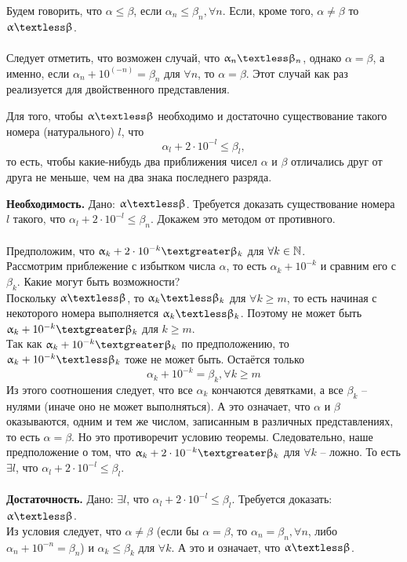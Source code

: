 Будем говорить, что $\alpha \leqslant \beta$, если $\alpha_n \leqslant \beta_n, \forall n$. Если, кроме того, $\alpha \neq \beta$ то $\alpha \textless \beta$.\\\\
Следует отметить, что возможен случай, что $\alpha_n \textless \beta_n$, однако $\alpha = \beta$, а именно, если  $\alpha_n + {10}^{(-n)} = \beta_n$ для $\forall n$, то $\alpha = \beta$. Этот случай как раз реализуется для двойственного представления.\\
\begin{theorem}
	Для того, чтобы $\alpha \textless \beta$ необходимо и достаточно существование такого номера (натурального) $l$, что
	\[\alpha_l + 2 \cdot 10^{-l} \leqslant \beta_l,\]
	то есть, чтобы какие-нибудь два приближения чисел $\alpha$ и $\beta$ отличались друг от друга не меньше, чем на два знака последнего разряда. 
\end{theorem}
\begin{Proof}
	\textbf{Необходимость.} Дано: $\alpha \textless \beta$.
	Требуется доказать существование номера $l$ такого, что $\alpha_l + 2 \cdot 10^{-l} \leqslant \beta_n$. Докажем это методом от противного.\\\\
	Предположим, что $\alpha_k + 2 \cdot 10^{-k} \textgreater \beta_k$ для $\forall k \in \mathbb{N}$.\\
	Рассмотрим приблежение с избытком числа $\alpha$, то есть $\alpha_k + 10^{-k}$ и сравним его с $\beta_k$. Какие могут быть возможности?\\
	Поскольку $\alpha \textless \beta$, то $\alpha_k \textless \beta_k$ для $\forall k \geqslant m$, то есть начиная с некоторого номера выполняется $\alpha_k \textless \beta_k$. Поэтому не может быть $\alpha_k + 10^{-k}\textgreater \beta_k$ для $k \geqslant m$.\\
	Так как $\alpha_k + 10^{-k}\textgreater \beta_k$ по предположению, то $\alpha_k + 10^{-k} \textless \beta_k$ тоже не может быть. Остаётся только
	\[\alpha_k + 10^{-k} = \beta_k, \forall k \geqslant m\]
	Из этого соотношения следует, что все $\alpha_k$ кончаются девятками, а все $\beta_k$ -- нулями (иначе оно не может выполняться). А это означает, что $\alpha$ и $\beta$ оказываются, одним и тем же числом, записанным в различных представлениях, то есть $\alpha = \beta$. Но это противоречит условию теоремы. Следовательно, наше предположение о том, что $\alpha_k + 2 \cdot 10^{-k} \textgreater \beta_k$ для $\forall k$ -- ложно. То есть $\exists l$, что $\alpha_l + 2 \cdot 10^{-l} \leqslant \beta_l$.\\\\
	\textbf{Достаточность.} Дано:  $\exists l$, что $\alpha_l + 2 \cdot 10^{-l} \leqslant \beta_l$.
	Требуется доказать: $\alpha \textless \beta$.\\
	Из условия следует, что $\alpha \neq \beta$ (если бы $\alpha = \beta$, то $\alpha_n = \beta_n, \forall n$, либо $\alpha_n + 10^{-n} = \beta_n$) и $\alpha_k \leqslant \beta_k$ для $\forall k$. А это и означает, что $\alpha \textless \beta$.
\end{Proof}
